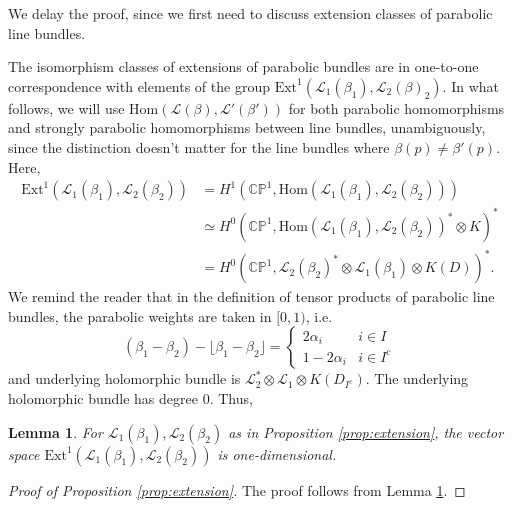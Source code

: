 \documentclass[12pt,letterpaper,reqno]{amsart}
\newtheorem{lem}[thm]{Lemma}
\theoremstyle{remark}
\theoremstyle{definition}
\numberwithin{thm}{section}
\numberwithin{equation}{section}
\numberwithin{figure}{section}
\newcommand{\cL}{\ensuremath{\mathcal L}}
\newcommand{\CP}{\ensuremath{\mathbb {CP}}}
\begin{document}
We delay the proof, since we first need to discuss extension classes of parabolic line bundles. 

The isomorphism classes of extensions of parabolic bundles are in one-to-one correspondence with elements of
the group $\mathrm{Ext}^1(\cL_1(\beta_1), \cL_2(\beta)_2)$. In what follows,  we will use $\mathrm{Hom}(\cL(\beta), \cL'(\beta'))$ for both parabolic homomorphisms and strongly parabolic homomorphisms
between line bundles, unambiguously, since the distinction doesn't matter for the line bundles where $\beta(p) \neq \beta'(p)$. Here, 
\begin{align*}\mathrm{Ext}^1(\cL_1(\beta_1), \cL_2(\beta_2))&=H^1(\CP^1, \mathrm{Hom}(\cL_1(\beta_1), \cL_2(\beta_2)))\\
& \simeq H^0(\CP^1, \mathrm{Hom}(\cL_1(\beta_1), \cL_2(\beta_2))^* \otimes K)^*\\
&= H^0\left(\CP^1, 
\cL_2(\beta_2)^* \otimes \cL_1(\beta_1) \otimes K(D)\right)^*. \end{align*}
We remind the reader that in the definition of tensor products of parabolic line bundles, the parabolic weights are taken in $[0,1)$, i.e.  \[(\beta_1 -\beta_2)- \lfloor \beta_1 - \beta_2 \rfloor = \begin{cases} 2 \alpha_i & i \in I\\ 1-2 \alpha_i & i \in I^c \end{cases}\] and underlying holomorphic bundle
is $\cL_2^* \otimes \cL_1 \otimes K(D_{I^c})$. The underlying holomorphic bundle has degree $0$. Thus, 
\begin{lem}\label{lem:extensionclasses}
For $\cL_1(\beta_1), \cL_2(\beta_2)$ as in Proposition \ref{prop:extension},
the vector space $\mathrm{Ext}^1(\cL_1(\beta_1), \cL_2(\beta_2))$ is one-dimensional.
\end{lem}
\begin{proof}[Proof of Proposition \ref{prop:extension}] The proof follows from Lemma \ref{lem:extensionclasses}.
\end{proof}
\end{document}
